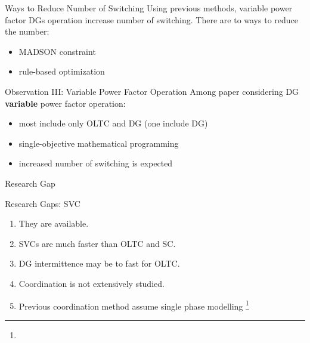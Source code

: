 \documentclass[10pt]{beamer}
\begin{document}



\begin{frame}{Ways to Reduce Number of Switching}
Using previous methods, variable power factor DGs operation increase number of switching. There are to ways to reduce the number:
\begin{itemize}
\item MADSON constraint 
\item rule-based optimization
\end{itemize}
\end{frame}


\begin{frame}{Observation III: Variable Power Factor Operation}
Among paper considering DG \textbf{variable} power factor operation:
\begin{itemize}
\item most include only OLTC and DG (one include DG)
\item single-objective mathematical programming
\item increased number of switching is expected
\end{itemize}
\end{frame}

%


\begin{frame}{}
\begin{center}
\huge{Research Gap}
\end{center}
\end{frame}
\begin{frame}{Research Gaps: SVC}
\begin{enumerate}
\item They are available.
\item SVCs are much faster than OLTC and SC.
\item DG intermittence may be to fast for OLTC.
\item Coordination is not extensively studied.
\item Previous coordination method assume single phase modelling   \footnote{}
\end{enumerate}
\end{frame}
\end{document}
